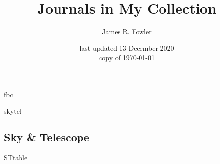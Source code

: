 \documentclass[letterpaper]{article}
\begin{document}
\title{Journals in My Collection}
\author{James R. Fowler}
\date{last updated 13 December 2020\\ copy of \today}

  \maketitle

\tableofcontents
\listoftables



{fbc}

{skytel}

\newpage
\appendixpage
\begin{appendix}

  \section{Sky \& Telescope}
  {STtable}

\end{appendix}
\end{document}
